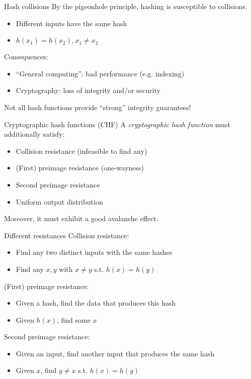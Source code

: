 \begin{frame}{Hash collisions}
  By the pigeonhole principle, hashing is susceptible to collisions.
  \begin{itemize}[<+(1)->]
    \item Different inputs have the same hash
    \item $h(x_1) = h(x_2), x_1 \neq x_2$
  \end{itemize}

  \vspace*{1em}

  \pause
  Consequences:
  \begin{itemize}[<+(1)->]
    \item \enquote{General computing}: bad performance (e.g. indexing)
    \item Cryptography: loss of integrity and/or security
  \end{itemize}

  \vspace*{1em}

  \pause
  Not all hash functions provide \enquote{strong} integrity guarantees!
\end{frame}

\begin{frame}{Cryptographic hash functions (CHF)}
  A \emph{cryptographic hash function} must additionally satisfy:
  \begin{itemize}[<+(1)->]
    \item Collision resistance (infeasible to find any)
    \item (First) preimage resistance (one-wayness)
    \item Second preimage resistance
    \item Uniform output distribution
  \end{itemize}

  \pause
  Moreover, it must exhibit a good avalanche effect.
\end{frame}

\begin{frame}{Different resistances}
  Collision resistance:
  \begin{itemize}[<+(1)->]
    \item Find any two distinct inputs with the same hashes
    \item Find any $x, y$ with $x \neq y$ s.t. $h(x) = h(y)$
  \end{itemize}

  \pause
  (First) preimage resistance:
  \begin{itemize}[<+(1)->]
    \item Given a hash, find the data that produces this hash
    \item Given $h(x)$, find some $x$
  \end{itemize}

  \pause
  Second preimage resistance:
  \begin{itemize}[<+(1)->]
    \item Given an input, find another input that produces the same hash
    \item Given $x$, find $y \neq x$ s.t. $h(x) = h(y)$
  \end{itemize}
\end{frame}

